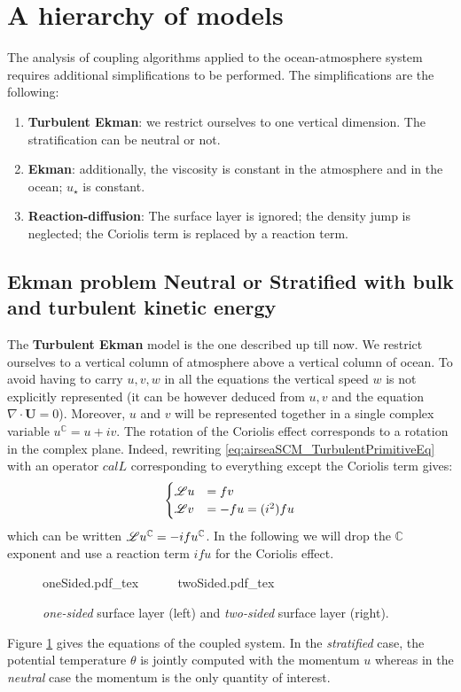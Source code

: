 \section{A hierarchy of models}
\label{sec:airseaSCM_hierarchy}
The analysis of coupling algorithms applied to the
ocean-atmosphere system requires additional
simplifications to be performed.
The simplifications are the following:
\begin{enumerate}
	\item \textbf{Turbulent Ekman}: we restrict ourselves to one
		vertical dimension. The stratification can be
		neutral or not.
	\item \textbf{Ekman}: additionally,
		the viscosity is constant in the
		atmosphere and in the ocean; $u_\star$ is constant.
	\item \textbf{Reaction-diffusion}: The surface layer is ignored;
		the density jump is neglected;
		the Coriolis term is replaced by a reaction term.
\end{enumerate}
\subsection{Ekman problem Neutral or Stratified with bulk and turbulent kinetic energy}
\label{sec:airseaSCM_hierarchy_TurbulentEkman}
The \textbf{Turbulent Ekman} model is the one described up till now.
We restrict ourselves to a vertical column of atmosphere
above a vertical column of ocean.
To avoid having to carry $u, v, w$ in all the equations
the vertical speed $w$ is not explicitly represented
(it can be however deduced from $u,v$ and the equation
$\nabla \cdot \mathbf{U}=0$).
Moreover, $u$ and $v$ will be represented together in
a single complex variable $u^{\mathbb{C}} = u+iv$.
The rotation of the Coriolis effect corresponds to
a rotation in the complex plane.
Indeed, rewriting \eqref{eq:airseaSCM_TurbulentPrimitiveEq}
with an operator ${cal L}$ corresponding to everything except
the Coriolis term gives:
\begin{equation}
	\label{eq:airseaSCM_complexForm}
\begin{cases}
	{\cal L}u &= fv\\
	{\cal L}v &= - fu = (i^2) f u
\end{cases}
\end{equation}
which can be written ${\cal L}u^{\mathbb{C}} = -i f u^\mathbb{C}$.
In the following we will drop the ${\mathbb{C}}$ exponent
and use a reaction term $ifu$ for the Coriolis effect.
\begin{figure}
	\centering
	{oneSided.pdf_tex}
	~~~~~
	{twoSided.pdf_tex}
	\caption{\textit{one-sided} surface layer
	(left) and \textit{two-sided} surface layer (right).
	}
	\label{fig:airseaSCM_twoSidedBulk_drawing}
\end{figure}
Figure \ref{fig:airseaSCM_twoSidedBulk_drawing} gives
the equations of the coupled system. In the \textit{stratified}
case, the potential temperature $\theta$ is jointly computed with the
momentum $u$ whereas in the \textit{neutral} case the momentum
is the only quantity of interest.
